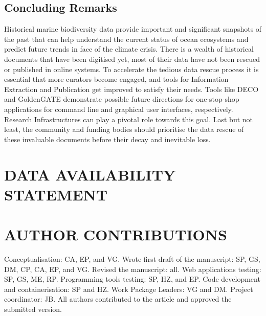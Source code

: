    \subsection{Concluding Remarks}
   Historical marine biodiversity data provide important and significant
snapshots of the past that can help understand the current status of ocean
ecosystems and predict future trends in face of the climate crisis. There is a
wealth of historical documents that have been digitised yet, most of their data
have not been rescued or published in online systems. To accelerate the tedious
data rescue process it is essential that more curators become engaged, and
tools for Information Extraction and Publication get improved to satisfy their
needs. Tools like DECO and GoldenGATE demonstrate possible future directions
for one-stop-shop applications for command line and graphical user interfaces,
respectively. Research Infrastructures can play a pivotal role towards this
goal. Last but not least, the community and funding bodies should prioritise
the data rescue of these invaluable documents before their decay and inevitable
loss.


\section{DATA AVAILABILITY STATEMENT}


\section{AUTHOR CONTRIBUTIONS}

Conceptualisation: CA, EP, and VG. Wrote first draft of the manuscript: SP, GS,
DM, CP, CA, EP, and VG. Revised the manuscript: all. Web applications testing:
SP, GS, ME, RP. Programming tools testing: SP, HZ, and EP. Code development and
containerisation: SP and HZ. Work Package Leaders: VG and DM. Project
coordinator: JB. All authors contributed to the article and approved the
submitted version.

